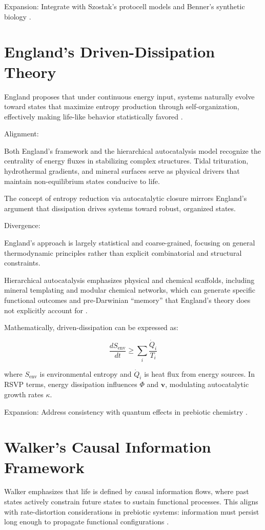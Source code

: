 \documentclass[openany]{book}
\begin{document}
Expansion: Integrate with Szostak's protocell models \citep{szostak2001} and Benner's synthetic biology \citep{benner2010}.

\section{England’s Driven-Dissipation Theory}
England proposes that under continuous energy input, systems naturally evolve toward states that maximize entropy production through self-organization, effectively making life-like behavior statistically favored \citep{england2013}.

Alignment:

Both England’s framework and the hierarchical autocatalysis model recognize the centrality of energy fluxes in stabilizing complex structures. Tidal trituration, hydrothermal gradients, and mineral surfaces serve as physical drivers that maintain non-equilibrium states conducive to life.

The concept of entropy reduction via autocatalytic closure mirrors England’s argument that dissipation drives systems toward robust, organized states.

Divergence:

England’s approach is largely statistical and coarse-grained, focusing on general thermodynamic principles rather than explicit combinatorial and structural constraints.

Hierarchical autocatalysis emphasizes physical and chemical scaffolds, including mineral templating and modular chemical networks, which can generate specific functional outcomes and pre-Darwinian “memory” that England’s theory does not explicitly account for \citep{vasas2010}.

Mathematically, driven-dissipation can be expressed as:

\[\frac{dS_\text{env}}{dt} \ge \sum_i \frac{\dot{Q}_i}{T_i}\]

where $S_\text{env}$ is environmental entropy and $\dot{Q}_i$ is heat flux from energy sources. In RSVP terms, energy dissipation influences $\Phi$ and $\mathbf{v}$, modulating autocatalytic growth rates $\kappa$.

Expansion: Address consistency with quantum effects in prebiotic chemistry \citep{lambert2015}.

\section{Walker’s Causal Information Framework}
Walker emphasizes that life is defined by causal information flows, where past states actively constrain future states to sustain functional processes. This aligns with rate-distortion considerations in prebiotic systems: information must persist long enough to propagate functional configurations \citep{walker2013}.
\end{document}
